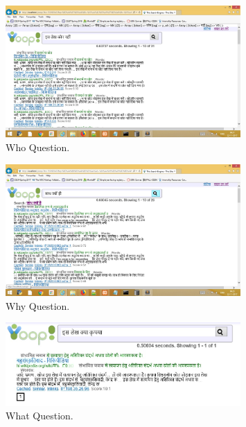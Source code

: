 \begin{figure}[htb]
\centering
\includegraphics[width=0.8\textwidth]{images/who_question.jpg}
\caption{Who Question.} 
\label{fig:who_question}
\end{figure}

\begin{figure}[htb]
\centering
\includegraphics[width=0.8\textwidth]{images/why_question.jpg}
\caption{Why Question.} 
\label{fig:why_question}
\end{figure}

\begin{figure}[htb]
\centering
\includegraphics[width=0.8\textwidth]{images/what_question.jpg}
\caption{What Question.} 
\label{fig:what_question}
\end{figure}